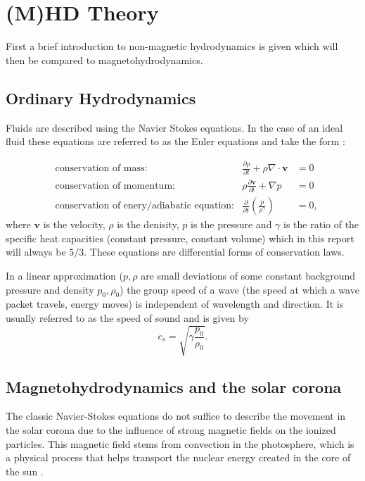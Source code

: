 \documentclass[a4paper]{article}
\numberwithin{figure}{section}
\numberwithin{equation}{section}
\begin{document}
\pagebreak
\section{(M)HD Theory} \label{sec:(m)hd_theory}

First a brief introduction to non-magnetic hydrodynamics is given which will then be compared to magnetohydrodynamics.

\subsection{Ordinary Hydrodynamics} \label{sec:ordinary_hydrodynamics}

Fluids are described using the Navier Stokes equations. In the case of an ideal fluid these equations are referred to as the Euler equations and take the form \cite[section 1.3]{acheson1990}:

\begin{align*}
	&\text{conservation of mass:} &\frac{\partial \rho}{\partial t} + \rho \nabla \cdot \mathbf v &=  0 \\
				    &\text{conservation of momentum:} &\rho \frac{\partial \mathbf v}{\partial t} + \nabla p &= 0\\
				    &\text{conservation of enery/adiabatic equation:} &\frac{\partial }{\partial t} \left( \frac{p}{\rho^{\gamma}} \right)  &= 0
,\end{align*}
where $\mathbf v$ is the velocity,  $\rho$ is the denisity, $p$ is the pressure and $\gamma$ is the ratio of the specific heat capacities (constant pressure, constant volume) which in this report will always be $5 / 3$. 
These equations are differential forms of conservation laws. 

In a linear approximation ($p, \rho$ are small deviations of some constant background pressure and density $p_0, \rho_0$) the group speed of a wave (the speed at which a wave packet travels, energy moves) is independent of wavelength and direction. It is usually referred to as the speed of sound and is given by\cite[section 3.6]{acheson1990} \[
c_s = \sqrt{\gamma \frac{p_0}{\rho_0}} 
.\] 

\subsection{Magnetohydrodynamics and the solar corona} \label{sec:magnetohydrodynamics_and_the_solar_corona}
The classic Navier-Stokes equations do not suffice to describe the movement in the solar corona due to the influence of strong magnetic fields on the ionized particles. This magnetic field stems from convection in the photosphere, which is a physical process that helps transport the nuclear energy created in the core of the sun \cite{brun2017magnetism}.\\
\end{document}
